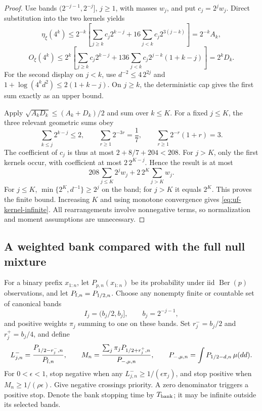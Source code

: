 \begin{proof}
Use bands $(2^{-j-1},2^{-j}]$, $j\ge1$, with masses $w_j$, and put
$c_j=2^jw_j$. Direct substitution into the two kernels yields
\[
 \eta_\xi(4^k)\le2^{-k}
 \left[\sum_{j\ge k}c_j2^{k-j}
              +16\sum_{j<k}c_j2^{3(j-k)}\right]=2^{-k}A_k,
\]
\[
 O_\xi(4^k)\le2^k
 \left[\sum_{j\ge k}c_j2^{k-j}
        +136\sum_{j<k}c_j2^{j-k}(1+k-j)\right]=2^kD_k.
\]
For the second display on $j<k$, use
$d^{-2}\le4\,2^{2j}$ and
$1+\log(4^kd^2)\le2(1+k-j)$.
On $j\ge k$, the deterministic cap gives the first sum exactly as
an upper bound.

Apply $\sqrt{A_kD_k}\le(A_k+D_k)/2$ and sum over $k\le K$.
For a fixed $j\le K$, the three relevant geometric sums obey
\[
 \sum_{k\le j}2^{k-j}\le2,\qquad
 \sum_{r\ge1}2^{-3r}=\frac17,\qquad
 \sum_{r\ge1}2^{-r}(1+r)=3.
\]
The coefficient of $c_j$ is thus at most
$2+8/7+204<208$. For $j>K$, only the first kernels occur, with
coefficient at most $2\,2^{K-j}$. Hence the result is at most
\[
 208\sum_{j\le K}2^jw_j+2\,2^K\sum_{j>K}w_j.
\]
For $j\le K$, $\min\{2^K,d^{-1}\}\ge2^j$ on the band; for $j>K$
it equals $2^K$. This proves the finite bound. Increasing $K$ and
using monotone convergence gives \eqref{eq:uf-kernel-infinite}.
All rearrangements involve nonnegative terms, so normalization and
moment assumptions are unnecessary.
\end{proof}

\subsection{A weighted bank compared with the full null mixture}

For a binary prefix $x_{1:n}$, let $P_{p,n}(x_{1:n})$ be its probability
under iid $\operatorname{Ber}(p)$ observations, and let
$P_{{\rm f},n}=P_{1/2,n}$. Choose any nonempty finite or countable set
of canonical bands
\[
 I_j=(b_j/2,b_j],\qquad b_j=2^{-j-1},
\]
and positive weights $\pi_j$ summing to one on these bands.
Set $r_j^-=b_j/2$ and $r_j^+=b_j/4$, and define
\[
 L_{j,n}^-=\frac{P_{1/2-r_j^-,n}}{P_{{\rm f},n}},
 \qquad
 M_n=\frac{\sum_j\pi_jP_{1/2+r_j^+,n}}
           {P_{-,\mu,n}},
 \qquad
 P_{-,\mu,n}=\int P_{1/2-d,n}\,\mu(dd).
\]
For $0<\epsilon<1$, stop negative when any
$L_{j,n}^-\ge1/(\epsilon\pi_j)$, and stop positive when
$M_n\ge1/(\rho\epsilon)$. Give negative crossings priority.
A zero denominator triggers a positive stop. Denote the bank stopping
time by $T_{\rm bank}$; it may be infinite outside its selected bands.

